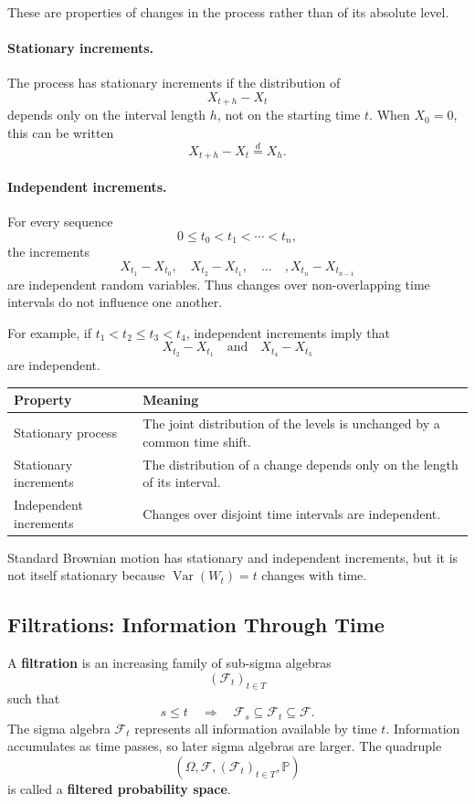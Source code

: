 \documentclass[12pt,openany]{book}
\theoremstyle{definition}
\theoremstyle{remark}
\begin{document}
These are properties of changes in the process rather than of its absolute
level.

\paragraph{Stationary increments.}
The process has stationary increments if the distribution of
\[
X_{t+h}-X_t
\]
depends only on the interval length \(h\), not on the starting time \(t\).
When \(X_0=0\), this can be written
\[
X_{t+h}-X_t\overset{d}{=}X_h.
\]

\paragraph{Independent increments.}
For every sequence
\[
0\leq t_0<t_1<\cdots<t_n,
\]
the increments
\[
X_{t_1}-X_{t_0},
\quad
X_{t_2}-X_{t_1},
\quad\ldots\quad,
X_{t_n}-X_{t_{n-1}}
\]
are independent random variables. Thus changes over non-overlapping time
intervals do not influence one another.

For example, if \(t_1<t_2\leq t_3<t_4\), independent increments imply that
\[
X_{t_2}-X_{t_1}
\quad\text{and}\quad
X_{t_4}-X_{t_3}
\]
are independent.

\begin{center}
\begin{tabular}{L{0.28\textwidth}L{0.62\textwidth}}
\toprule
\textbf{Property} & \textbf{Meaning} \\
\midrule
Stationary process & The joint distribution of the levels is unchanged by a
common time shift. \\
Stationary increments & The distribution of a change depends only on the
length of its interval. \\
Independent increments & Changes over disjoint time intervals are
independent. \\
\bottomrule
\end{tabular}
\end{center}

Standard Brownian motion has stationary and independent increments, but it
is not itself stationary because
\(\operatorname{Var}(W_t)=t\) changes with time.

\subsection{Filtrations: Information Through Time}

A \textbf{filtration} is an increasing family of sub-sigma algebras
\[
(\mathcal{F}_t)_{t\in T}
\]
such that
\[
s\leq t
\quad\Longrightarrow\quad
\mathcal{F}_s\subseteq\mathcal{F}_t\subseteq\mathcal{F}.
\]
The sigma algebra \(\mathcal{F}_t\) represents all information available by
time \(t\). Information accumulates as time passes, so later sigma algebras
are larger. The quadruple
\[
(\Omega,\mathcal{F},(\mathcal{F}_t)_{t\in T},\mathbb{P})
\]
is called a \textbf{filtered probability space}.
\end{document}
